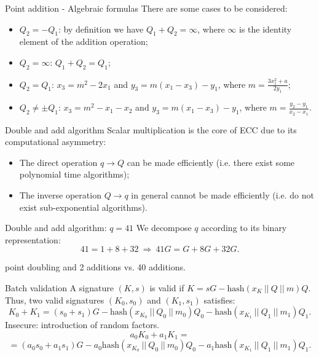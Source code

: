 \documentclass[slidescentered]{beamer}
\begin{document}
	\begin{frame}{Point addition - Algebraic formulas}
		There are some cases to be considered:
		\begin{itemize}
			\item $Q_2 = -Q_1$: by definition we have $Q_1 + Q_2 = \infty$, where $\infty$ is the identity element of the addition operation;
			\item $Q_2 = \infty$: $Q_1 + Q_2 = Q_1$;
			\item $Q_2 = Q_1$: $x_3 = m^2 - 2x_1$ and $y_3 = m(x_1 - x_3) - y_1$, where $m = \frac{3x_1^2 + a}{2y_1}$;
			\item $Q_2 \neq \pm Q_1$: $x_3 = m^2 - x_1 - x_2$ and $y_3 = m(x_1 - x_3) - y_1$, where $m = \frac{y_2 - y_1}{x_2 - x_1}$.
		\end{itemize}
	\end{frame}
	
	\begin{frame}{Double and add algorithm}
		Scalar multiplication is the core of ECC due to its computational asymmetry:
		\begin{itemize}
			\item The direct operation $q \to Q$ can be made efficiently (i.e. there exist some polynomial time algorithms);
			\item The inverse operation $Q \to q$ in general cannot be made efficiently (i.e. do not exist sub-exponential algorithms).
		\end{itemize}
	
		\bigskip
		\noindent
			
		\begin{block}{Double and add algorithm: $q = 41$}
			We decompose $q$ according to its binary representation:
			$$41 = 1 + 8 + 32  \ \Longrightarrow \ 41G = G + 8G + 32G.$$
			
			 point doubling and 2 additions vs. 40 additions.
	\end{block}
	\end{frame}

	\begin{frame}{Batch validation}
		A signature $(K, s)$ is valid if $K = sG - \text{hash}(x_K \ || \ Q \ || \ m)Q$. Thus, two valid signatures $(K_0, s_0)$ and $(K_1, s_1)$ satisfies:
		$$K_0 + K_1 = (s_0 + s_1)G - \text{hash}(x_{K_0} \ || \ Q_0 \ || \ m_0)Q_0 - \text{hash}(x_{K_1} \ || \ Q_1 \ || \ m_1)Q_1.$$
		Insecure: introduction of random factors.
		$$a_0K_0 + a_1K_1 =$$ $$
		= (a_0s_0 + a_1s_1)G - a_0\text{hash}(x_{K_0} \ || \ Q_0 \ || \ m_0)Q_0 - a_1\text{hash}(x_{K_1} \ || \ Q_1 \ || \ m_1)Q_1.$$
	\end{frame}
\end{document}
